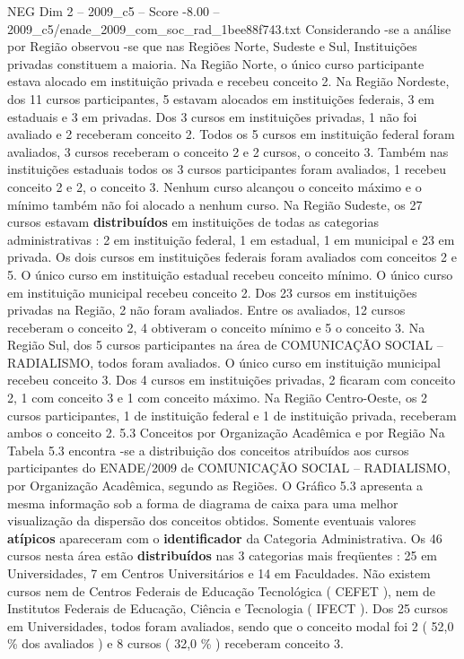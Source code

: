 \begin{textsample}{NEG Dim 2 – 2009\_c5 – Score -8.00 – 2009\_c5/enade\_2009\_com\_soc\_rad\_1bee88f743.txt}
Considerando -se a análise por Região observou -se que nas Regiões Norte, Sudeste e Sul, Instituições privadas constituem a maioria.
Na Região Norte, o único curso participante estava alocado em instituição privada e recebeu conceito 2.
Na Região Nordeste, dos 11 cursos participantes, 5 estavam alocados em instituições federais, 3 em estaduais e 3 em privadas.
Dos 3 cursos em instituições privadas, 1 não foi avaliado e 2 receberam conceito 2.
Todos os 5 cursos em instituição federal foram avaliados, 3 cursos receberam o conceito 2 e 2 cursos, o conceito 3.
Também nas instituições estaduais todos os 3 cursos participantes foram avaliados, 1 recebeu conceito 2 e 2, o conceito 3.
Nenhum curso alcançou o conceito máximo e o mínimo também não foi alocado a nenhum curso.
Na Região Sudeste, os 27 cursos estavam \textbf{distribuídos} em instituições de todas as categorias administrativas : 2 em instituição federal, 1 em estadual, 1 em municipal e 23 em privada.
Os dois cursos em instituições federais foram avaliados com conceitos 2 e 5.
O único curso em instituição estadual recebeu conceito mínimo.
O único curso em instituição municipal recebeu conceito 2.
Dos 23 cursos em instituições privadas na Região, 2 não foram avaliados.
Entre os avaliados, 12 cursos receberam o conceito 2, 4 obtiveram o conceito mínimo e 5 o conceito 3.
Na Região Sul, dos 5 cursos participantes na área de COMUNICAÇÃO SOCIAL – RADIALISMO, todos foram avaliados.
O único curso em instituição municipal recebeu conceito 3.
Dos 4 cursos em instituições privadas, 2 ficaram com conceito 2, 1 com conceito 3 e 1 com conceito máximo.
Na Região Centro-Oeste, os 2 cursos participantes, 1 de instituição federal e 1 de instituição privada, receberam ambos o conceito 2. 5.3 Conceitos por Organização Acadêmica e por Região Na Tabela 5.3 encontra -se a distribuição dos conceitos atribuídos aos cursos participantes do ENADE/2009 de COMUNICAÇÃO SOCIAL – RADIALISMO, por Organização Acadêmica, segundo as Regiões.
O Gráfico 5.3 apresenta a mesma informação sob a forma de diagrama de caixa para uma melhor visualização da dispersão dos conceitos obtidos.
Somente eventuais valores \textbf{atípicos} apareceram com o \textbf{identificador} da Categoria Administrativa.
Os 46 cursos nesta área estão \textbf{distribuídos} nas 3 categorias mais freqüentes : 25 em Universidades, 7 em Centros Universitários e 14 em Faculdades.
Não existem cursos nem de Centros Federais de Educação Tecnológica ( CEFET ), nem de Institutos Federais de Educação, Ciência e Tecnologia ( IFECT ).
Dos 25 cursos em Universidades, todos foram avaliados, sendo que o conceito modal foi 2 ( 52,0 \% dos avaliados ) e 8 cursos ( 32,0 \% ) receberam conceito 3.

\end{textsample}
